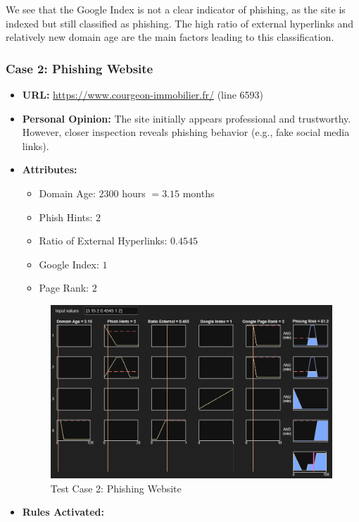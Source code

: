\documentclass[11pt]{article}
\begin{document}
We see that the Google Index is not a clear indicator of phishing, as the site is indexed but still classified as phishing. The high ratio of external hyperlinks and relatively new domain age are the main factors leading to this classification.

\subsubsection{Case 2: Phishing Website}

\begin{itemize}
    \item \textbf{URL:} \url{https://www.courgeon-immobilier.fr/} (line 6593)
    \item \textbf{Personal Opinion:} The site initially appears professional and trustworthy. However, closer inspection reveals phishing behavior (e.g., fake social media links).
    \item \textbf{Attributes:}
    \begin{itemize}
        \item Domain Age: $2300$ hours $= 3.15$ months
        \item Phish Hints: $2$
        \item Ratio of External Hyperlinks: $0.4545$
        \item Google Index: $1$
        \item Page Rank: $2$
    \end{itemize}
    \begin{figure}[h!]
        \centering
        \includegraphics[width=\textwidth]{test-2.png}
        \caption{Test Case 2: Phishing Website}
    \end{figure}
    \item \textbf{Rules Activated:} 

\end{itemize}
\end{document}
